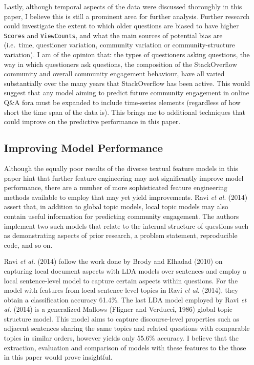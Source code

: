 \documentclass[11pt,preprint, authoryear]{article}
\begin{document}
Lastly, although temporal aspects of the data were discussed thoroughly
in this paper, I believe this is still a prominent area for further
analysis. Further research could investigate the extent to which older
questions are biased to have higher \texttt{Scores} and
\texttt{ViewCounts}, and what the main sources of potential bias are
(i.e.~time, questioner variation, community variation or
community-structure variation). I am of the opinion that: the types of
questioners asking questions, the way in which questioners ask
questions, the composition of the StackOverflow community and overall
community engagement behaviour, have all varied substantially over the
many years that StackOverflow has been active. This would suggest that
any model aiming to predict future community engagement in online Q\&A
fora must be expanded to include time-series elements (regardless of how
short the time span of the data is). This brings me to additional
techniques that could improve on the predictive performance in this
paper.

\subsection{Improving Model
Performance}\label{improving-model-performance}

Although the equally poor results of the diverse textual feature models
in this paper hint that further feature engineering may not
significantly improve model performance, there are a number of more
sophisticated feature engineering methods available to employ that may
yet yield improvements. Ravi \emph{et al.} (2014) assert that, in
addition to global topic models, local topic models may also contain
useful information for predicting community engagement. The authors
implement two such models that relate to the internal structure of
questions such as demonstrating aspects of prior research, a problem
statement, reproducible code, and so on.

Ravi \emph{et al.} (2014) follow the work done by Brody and Elhadad
(2010) on capturing local document aspects with LDA models over
sentences and employ a local sentence-level model to capture certain
aspects within questions. For the model with features from local
sentence-level topics in Ravi \emph{et al.} (2014), they obtain a
classification accuracy 61.4\%. The last LDA model employed by Ravi
\emph{et al.} (2014) is a generalized Mallows (Fligner and Verducci,
1986) global topic structure model. This model aims to capture
discourse-level properties such as adjacent sentences sharing the same
topics and related questions with comparable topics in similar orders,
however yields only 55.6\% accuracy. I believe that the extraction,
evaluation and comparison of models with these features to the those in
this paper would prove insightful.
\end{document}
